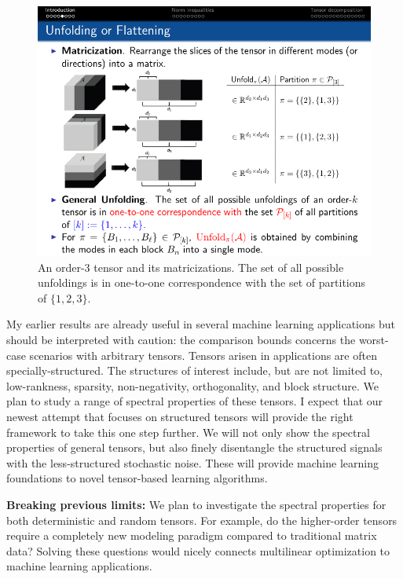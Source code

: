 \documentclass[10pt]{article}
\DeclareRobustCommand{\mybox}[2][gray!20]{%
\begin{tcolorbox}[   %
        breakable,
        left=0pt,
        right=0pt,
        top=0pt,
        bottom=0pt,
        colback=#1,
        colframe=#1,
        width=\dimexpr\textwidth\relax, 
        enlarge left by=0mm,
        boxsep=5pt,
        arc=0pt,outer arc=0pt,
        ]
        #2
\end{tcolorbox}
}
\DeclareRobustCommand{\mybox}[2][gray!20]{%
\begin{tcolorbox}[   %
        breakable,
        left=0pt,
        right=0pt,
        top=0pt,
        bottom=0pt,
        colback=#1,
        colframe=#1,
        width=\dimexpr\textwidth\relax, 
        enlarge left by=0mm,
        boxsep=5pt,
        arc=0pt,outer arc=0pt,
        ]
        #2
\end{tcolorbox}
}
\theoremstyle{definition}
\theoremstyle{definition}
\theoremstyle{definition}
\begin{document}
\begin{enumerate}
\begin{figure}[http]
\centering
\includegraphics[width=.62\textwidth]{flattern.pdf}
\caption{\small An order-$3$ tensor and its matricizations. The set of all possible unfoldings is in one-to-one correspondence with the set of partitions of $\{1,2, 3\}$.
} \label{fig:1}
\end{figure}


My earlier results are already useful in several machine learning applications but should be interpreted with caution: the comparison bounds concerns the worst-case scenarios with arbitrary tensors. Tensors arisen in applications are often specially-structured. The structures of interest include, but are not limited to, low-rankness, sparsity, non-negativity, orthogonality, and block structure. We plan to study a range of spectral properties of these tensors. I expect that our newest attempt that focuses on structured tensors will provide the right framework to take this one step further. We will not only show the spectral properties of general tensors, but also finely disentangle the structured signals with the less-structured stochastic noise. These will provide machine learning foundations to novel tensor-based learning algorithms. 


\mybox[gray!20]{{\bf Breaking previous limits:} We plan to investigate the spectral properties for both deterministic and random tensors. For example, do the higher-order tensors require a completely new modeling paradigm compared to traditional matrix data? Solving these questions would nicely connects multilinear optimization to machine learning applications.}



\end{enumerate}
\end{document}
